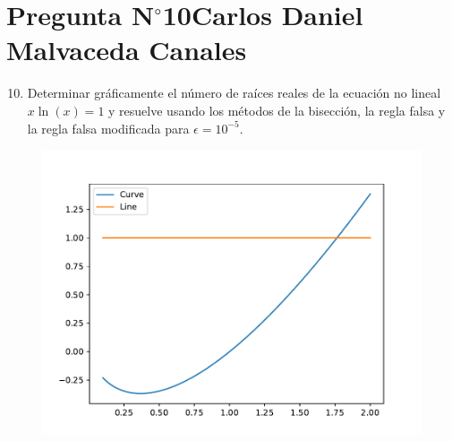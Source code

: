 \section{Pregunta N$^{\circ}$10\qquad Carlos Daniel Malvaceda Canales}

\begin{frame}
	\begin{enumerate}\setcounter{enumi}{9}
		\item

		      Determinar gráficamente el número de raíces reales de la
		      ecuación no lineal
		      \begin{math}
			      x\ln\left(x\right)=
			      1
		      \end{math}
		      y resuelve usando los métodos de la bisección, la regla
		      falsa y la regla falsa modificada para $\epsilon=10^{-5}$.
	\end{enumerate}

	\begin{solution}

		\begin{figure}
			\includegraphics[width=0.5\paperwidth]{p10.pdf}
		\end{figure}

	\end{solution}
\end{frame}


